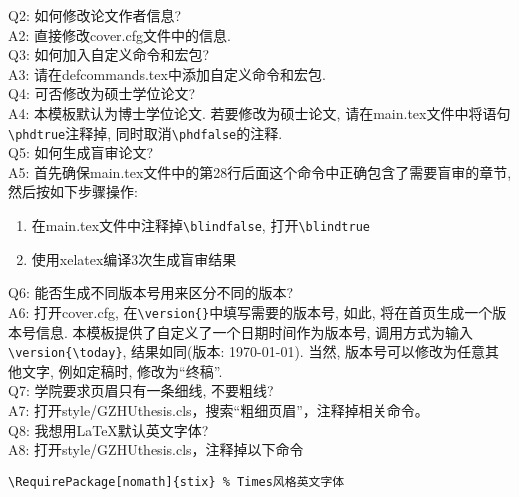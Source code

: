 Q2: 如何修改论文作者信息?\\
A2: 直接修改cover.cfg文件中的信息.\\

Q3: 如何加入自定义命令和宏包?\\
A3: 请在defcommands.tex中添加自定义命令和宏包.\\

Q4: 可否修改为硕士学位论文?\\
A4: 本模板默认为博士学位论文. 若要修改为硕士论文, 请在main.tex文件中将语句\verb|\phdtrue|注释掉, 同时取消\verb|\phdfalse|的注释. \\

Q5: 如何生成盲审论文?\\
A5: 首先确保main.tex文件中的第28行后面这个\verb||命令中正确包含了需要盲审的章节, 然后按如下步骤操作:
\begin{enumerate}
\item 在main.tex文件中注释掉\verb|\blindfalse|, 打开\verb|\blindtrue|
\item 使用xelatex编译3次生成盲审结果
\end{enumerate}

Q6: 能否生成不同版本号用来区分不同的版本?\\
A6: 打开cover.cfg, 在\verb|\version{}|中填写需要的版本号, 如此, 将在首页生成一个版本号信息. 本模板提供了自定义了一个日期时间作为版本号, 调用方式为输入\verb|\version{\today}|, 结果如同(版本: \today). 当然, 版本号可以修改为任意其他文字, 例如定稿时, 修改为“终稿”.\\

Q7: 学院要求页眉只有一条细线, 不要粗线?\\
A7: 打开style/GZHUthesis.cls，搜索“粗细页眉”，注释掉相关命令。\\

Q8: 我想用\LaTeX{}默认英文字体?\\
A8: 打开style/GZHUthesis.cls，注释掉以下命令
\begin{verbatim}
\RequirePackage[nomath]{stix} % Times风格英文字体
\end{verbatim}